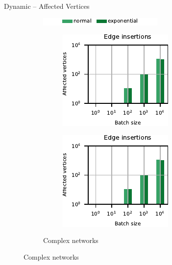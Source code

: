 \documentclass[10pt,titlepage,english,presentation]{beamer}
\begin{document}
\begin{frame}{Dynamic \suitor -- Affected Vertices}
\begin{figure}
\begin{subfigure}[t]{\textwidth}
\centering
\includegraphics[width=.3\textwidth]{../sources/plots/dyn-mwm/legend-cplx.pdf}
\end{subfigure}\smallskip

\begin{subfigure}[t]{\textwidth}
\begin{subfigure}[t]{.5\textwidth}
\centering
\includegraphics[width=.5\textwidth]{../sources/plots/dyn-mwm/affected-cplx-insertion.pdf}
\end{subfigure}\hfill
\begin{subfigure}[t]{.5\textwidth}
\centering
\includegraphics[width=.5\textwidth]{../sources/plots/dyn-mwm/affected-cplx-insertion.pdf}
\end{subfigure}
\caption*{\scriptsize Complex networks}
\end{subfigure}
\smallskip


\end{figure}
\end{frame}
\end{document}
